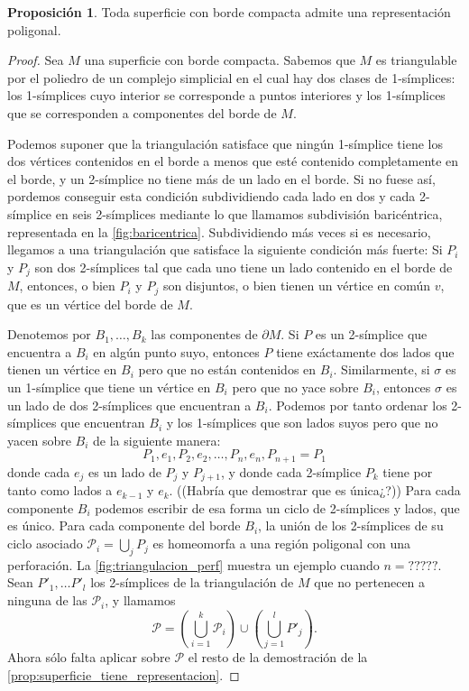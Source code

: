 \documentclass[10pt]{report}
\theoremstyle{definition}
\newtheorem{prop}[defin]{Proposición}
\begin{document}
\begin{prop}\label{prop:sup_borde_rep}
Toda superficie con borde compacta admite una representación poligonal.
\end{prop}
\begin{proof}
Sea $M$ una superficie con borde compacta. Sabemos que $M$ es triangulable por el poliedro de un complejo simplicial en el cual hay dos clases de 1-símplices: los 1-símplices cuyo interior se corresponde a puntos interiores y los 1-símplices que se corresponden a componentes del borde de $M$. 

Podemos suponer que la triangulación satisface que ningún 1-símplice tiene los dos vértices contenidos en el borde a menos que esté contenido completamente en el borde, y un 2-símplice no tiene más de un lado en el borde. Si no fuese así, pordemos conseguir esta condición subdividiendo cada lado en dos y cada 2-símplice en seis 2-símplices mediante lo que llamamos subdivisión baricéntrica, representada en la \autoref{fig:baricentrica}. Subdividiendo más veces si es necesario, llegamos a una triangulación que satisface la siguiente condición más fuerte: Si $P_i$ y $P_j$ son  dos 2-símplices tal que cada uno tiene un lado contenido en el borde de $M$, entonces, o bien $P_i$ y $P_j$ son disjuntos, o bien tienen un vértice en común $v$, que es un vértice del borde de $M$.

Denotemos por $B_1,\dots , B_k$ las componentes de $\partial M$. Si $P$ es un 2-símplice que encuentra a $B_i$ en algún punto suyo, entonces $P$ tiene exáctamente dos lados que tienen un vértice en $B_i$ pero que no están contenidos en $B_i$. Similarmente, si $\sigma$ es un 1-símplice que tiene un vértice en $B_i$ pero que no yace sobre $B_i$, entonces $\sigma$ es un lado de dos 2-símplices que encuentran a $B_i$. Podemos por tanto ordenar los 2-símplices que encuentran $B_i$ y los 1-símplices que son lados suyos pero que no yacen sobre $B_i$ de la siguiente manera: 
\begin{equation*}
P_1,e_1,P_2,e_2,\dots ,P_n,e_n,P_{n+1}=P_1
\end{equation*}
donde cada $e_j$ es un lado de $P_j$ y $P_{j+1}$, y donde cada 2-símplice $P_k$ tiene por tanto como lados a $e_{k-1}$ y $e_k$. ((Habría que demostrar que es única¿?)) Para cada componente $B_i$ podemos escribir de esa forma un ciclo de 2-símplices y lados, que es único. Para cada componente del borde $B_i$, la unión de los 2-símplices de su ciclo asociado $\mathcal{P}_i=\bigcup_{j}P_j$ es homeomorfa a una región poligonal con una perforación. La \autoref{fig:triangulacion_perf} muestra un ejemplo cuando $n=?????$. Sean $P'_1,\dots P'_l$ los 2-símplices de la triangulación de $M$ que no pertenecen a ninguna de las $\mathcal{P}_i$, y llamamos $$\mathcal{P}=\left( \bigcup_{i=1}^{k} \mathcal{P}_i\right) \cup \left( \bigcup_{j=1}^{l} P'_j\right).$$
Ahora sólo falta aplicar sobre $\mathcal{P}$ el resto de la demostración de la \autoref{prop:superficie_tiene_representacion}.
\end{proof}
\end{document}
